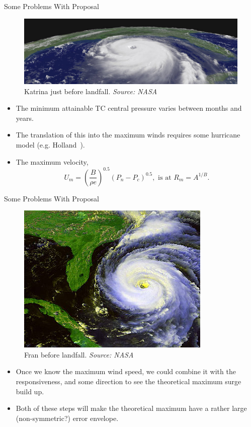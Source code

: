 \begin{frame}{Some Problems With Proposal}
\vspace{-15pt}
\begin{figure}
\includegraphics[width=\linewidth]{images/NASA-KATRINA-SIDEON.jpg}\\
Katrina just before landfall. \textit{Source: NASA}
\end{figure}
\vspace{-10pt}
\begin{itemize}
\item The minimum attainable TC central pressure varies between months and years.
\item The translation of this into the maximum winds requires some hurricane model
    (e.g. Holland~\cite{holland1980analytic, holland2010revised}).
\item
    The maximum velocity,
    \begin{equation}
    U_m = (\frac{B}{\rho e})^{0.5}(P_n-P_c)^{0.5}, \text{ is at }
    R_m = A^{1/B}.
    \end{equation}
\end{itemize}
\end{frame}


\begin{frame}{Some Problems With Proposal}
\vspace{-20pt}
\begin{figure}
\includegraphics[width=0.4\linewidth]{images/hurricane_fran.jpg}\\
Fran before landfall. \textit{Source: NASA}
\end{figure}
\begin{itemize}
\item Once we know the maximum wind speed, we could combine it with the responsiveness,
     and some direction to see the theoretical maximum surge build up.
\item Both of these steps will make the theoretical maximum have a rather large
     (non-symmetric?) error envelope.

\end{itemize}
\end{frame}

